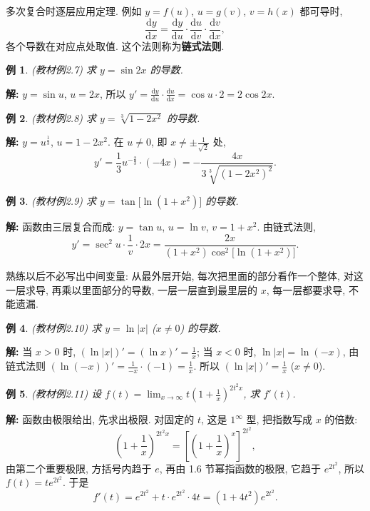 \documentclass[UTF8,openany]{ctexbook}
\theoremstyle{chinesetextbook}
\newtheorem{example}{例}[section]
\newenvironment{cnsolution}{\par\indent\textbf{解:} \ignorespaces}{\par}
\newcommand{\dd}{\mathrm d}
\begin{document}
多次复合时逐层应用定理. 例如 $y=f(u)$, $u=g(v)$, $v=h(x)$ 都可导时,
\[
\frac{\dd y}{\dd x}=\frac{\dd y}{\dd u}\cdot\frac{\dd u}{\dd v}\cdot\frac{\dd v}{\dd x},
\]
各个导数在对应点处取值. 这个法则称为\textbf{链式法则}.
\begin{example}\label{ex:c2-2-7}
\textnormal{(教材例2.7)} 求 $y=\sin2x$ 的导数.
\end{example}
\begin{cnsolution}
$y=\sin u$, $u=2x$, 所以 $\displaystyle y'=\frac{\dd y}{\dd u}\cdot\frac{\dd u}{\dd x}=\cos u\cdot2=2\cos2x$.
\end{cnsolution}
\begin{example}\label{ex:c2-2-8}
\textnormal{(教材例2.8)} 求 $y=\sqrt[3]{1-2x^2}$ 的导数.
\end{example}
\begin{cnsolution}
$y=u^{\frac13}$, $u=1-2x^2$. 在 $u\ne0$, 即 $\displaystyle x\ne\pm\frac1{\sqrt2}$ 处,
\[
y'=\frac13u^{-\frac23}\cdot(-4x)=-\frac{4x}{3\sqrt[3]{(1-2x^2)^2}}.
\]
\end{cnsolution}
\begin{example}\label{ex:c2-2-9}
\textnormal{(教材例2.9)} 求 $y=\tan\bigl[\ln(1+x^2)\bigr]$ 的导数.
\end{example}
\begin{cnsolution}
函数由三层复合而成: $y=\tan u$, $u=\ln v$, $v=1+x^2$. 由链式法则,
\[
y'=\sec^2u\cdot\frac1v\cdot2x=\frac{2x}{(1+x^2)\cos^2\bigl[\ln(1+x^2)\bigr]}.
\]
\end{cnsolution}
熟练以后不必写出中间变量: 从最外层开始, 每次把里面的部分看作一个整体, 对这一层求导, 再乘以里面部分的导数, 一层一层直到最里层的 $x$, 每一层都要求导, 不能遗漏.
\begin{example}\label{ex:c2-2-10}
\textnormal{(教材例2.10)} 求 $y=\ln|x|$ ($x\ne0$) 的导数.
\end{example}
\begin{cnsolution}
当 $x>0$ 时, $\displaystyle(\ln|x|)'=(\ln x)'=\frac1x$; 当 $x<0$ 时, $\ln|x|=\ln(-x)$, 由链式法则 $\displaystyle(\ln(-x))'=\frac1{-x}\cdot(-1)=\frac1x$. 所以 $\displaystyle(\ln|x|)'=\frac1x$ ($x\ne0$).
\end{cnsolution}
\begin{example}\label{ex:c2-2-11}
\textnormal{(教材例2.11)} 设 $\displaystyle f(t)=\lim_{x\to\infty}t\left(1+\frac1x\right)^{2t^2x}$, 求 $f'(t)$.
\end{example}
\begin{cnsolution}
函数由极限给出, 先求出极限. 对固定的 $t$, 这是 $1^\infty$ 型, 把指数写成 $x$ 的倍数:
\[
\left(1+\frac1x\right)^{2t^2x}=\left[\left(1+\frac1x\right)^x\right]^{2t^2},
\]
由第二个重要极限, 方括号内趋于 $e$, 再由 1.6 节幂指函数的极限, 它趋于 $e^{2t^2}$, 所以 $f(t)=te^{2t^2}$. 于是
\[
f'(t)=e^{2t^2}+t\cdot e^{2t^2}\cdot4t=(1+4t^2)e^{2t^2}.
\]
\end{cnsolution}
\end{document}

